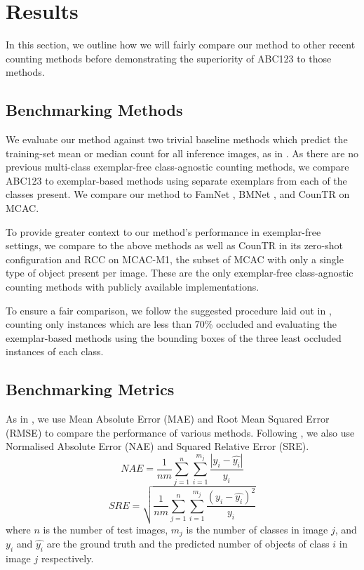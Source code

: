 \documentclass[../thesis.tex]{subfiles}
\begin{document}
\section{Results}\label{sec__ABC123__results}
In this section, we outline how we will fairly compare our method to other recent counting methods before demonstrating the superiority of ABC123 to those methods.

\subsection{Benchmarking Methods}
We evaluate our method against two trivial baseline methods which predict the training-set mean or median count for all inference images, as in . As there are no previous multi-class exemplar-free class-agnostic counting methods, we compare ABC123 to exemplar-based methods using separate exemplars from each of the classes present.
We compare our method to FamNet \cite{ranjan2021Famnet}, BMNet \cite{shi2022represent}, and CounTR \cite{liu2022countr} on MCAC.

To provide greater context to our method's performance in exemplar-free settings, we compare to the above methods as well as CounTR in its zero-shot configuration and RCC on MCAC-M1, the subset of MCAC with only a single type of object present per image.
These are the only exemplar-free class-agnostic counting methods with publicly available implementations.

To ensure a fair comparison, we follow the suggested procedure laid out in , counting only instances which are less than 70\% occluded and evaluating the exemplar-based methods using the bounding boxes of the three least occluded instances of each class.


\subsection{Benchmarking Metrics}
As in , we use Mean Absolute Error (MAE) and Root Mean Squared Error (RMSE) to compare the performance of various methods. Following \citet{nguyen2022few}, we also use Normalised Absolute Error (NAE) and Squared Relative Error (SRE).
\begin{equation}
NAE = \frac{1}{nm} \sum_{j=1}^n\sum_{i=1}^{m_{j}} \frac{|y_i-\hat{y_i}|}{y_i}
\end{equation}
\begin{equation}
SRE = \sqrt{\frac{1}{nm} \sum_{j=1}^n\sum_{i=1}^{m_{j}} \frac{(y_i-\hat{y_i})^2}{y_i}}
\end{equation}
\noindent where $n$ is the number of test images, $m_j$ is the number of classes in image $j$, and $y_i$ and $\hat{y_i}$ are the ground truth and the predicted number of objects of class $i$ in image $j$ respectively.
\end{document}
